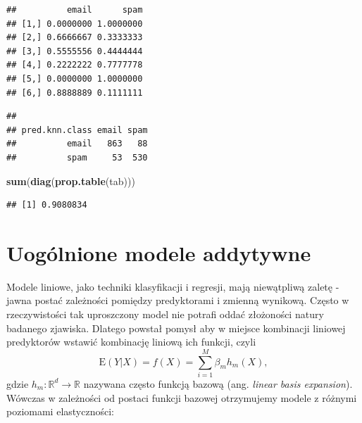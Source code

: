 \documentclass[]{book}
\newenvironment{Shaded}{\begin{snugshade}}{\end{snugshade}}
\newcommand{\KeywordTok}[1]{\textcolor[rgb]{0.13,0.29,0.53}{\textbf{#1}}}
\newcommand{\NormalTok}[1]{#1}
\newcommand{\OperatorTok}[1]{\textcolor[rgb]{0.81,0.36,0.00}{\textbf{#1}}}
\newcommand{\StringTok}[1]{\textcolor[rgb]{0.31,0.60,0.02}{#1}}
\newcommand{\E}{\mathrm{E}}
\theoremstyle{plain}
\theoremstyle{definition}
\theoremstyle{definition}
\theoremstyle{definition}
\theoremstyle{definition}
\theoremstyle{remark}
\begin{document}
\begin{verbatim}
##          email      spam
## [1,] 0.0000000 1.0000000
## [2,] 0.6666667 0.3333333
## [3,] 0.5555556 0.4444444
## [4,] 0.2222222 0.7777778
## [5,] 0.0000000 1.0000000
## [6,] 0.8888889 0.1111111
\end{verbatim}

\begin{Shaded}
\end{Shaded}

\begin{verbatim}
##               
## pred.knn.class email spam
##          email   863   88
##          spam     53  530
\end{verbatim}

\begin{Shaded}
\begin{Highlighting}[]
\KeywordTok{sum}\NormalTok{(}\KeywordTok{diag}\NormalTok{(}\KeywordTok{prop.table}\NormalTok{(tab)))}
\end{Highlighting}
\end{Shaded}

\begin{verbatim}
## [1] 0.9080834
\end{verbatim}

\hypertarget{uogolnione-modele-addytywne}{%
\chapter{Uogólnione modele addytywne}\label{uogolnione-modele-addytywne}}

Modele liniowe, jako techniki klasyfikacji i regresji, mają niewątpliwą zaletę - jawna postać zależności pomiędzy predyktorami i zmienną wynikową. Często w rzeczywistości tak uproszczony model nie potrafi oddać złożoności natury badanego zjawiska. Dlatego powstał pomysł aby w miejsce kombinacji liniowej predyktorów wstawić kombinację liniową ich funkcji, czyli
\begin{equation}
    \E(Y|X)=f(X) = \sum_{i=1}^M\beta_mh_m(X),
    \label{eq:row111}
\end{equation}
gdzie \(h_m:\mathbb{R}^d\to\mathbb{R}\) nazywana często funkcją bazową (ang. \emph{linear basis expansion}). Wówczas w zależności od postaci funkcji bazowej otrzymujemy modele z różnymi poziomami elastyczności:
\end{document}
